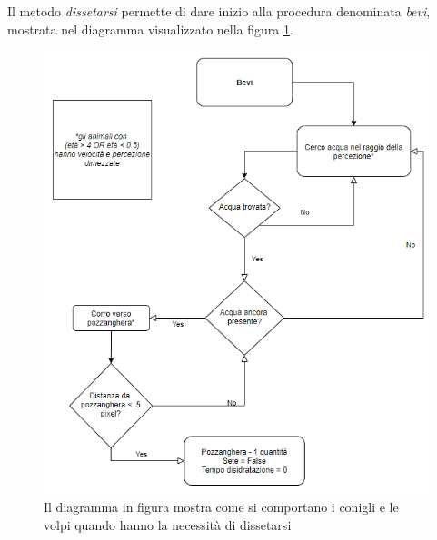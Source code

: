 \documentclass[11pt]{article}
\begin{document}
Il metodo \emph{dissetarsi} permette di dare inizio alla procedura denominata \emph{bevi}, mostrata nel diagramma visualizzato nella figura \ref{fig:diagrammaBevi}. 
\begin{figure}
     \centering
     \includegraphics[scale = 0.7]{Sete.png}
     \caption{Il diagramma in figura mostra come si comportano i conigli e le volpi quando hanno la necessità di dissetarsi}
     \label{fig:diagrammaBevi}
\end{figure}
\end{document}
